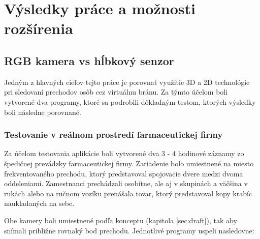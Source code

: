 \chapter{Výsledky práce a možnosti rozšírenia}
\section{RGB kamera vs hĺbkový senzor}
Jedným z hlavných cieľov tejto práce je porovnať využitie 3D a 2D technológie pri sledovaní prechodov osôb cez virtuálnu bránu. Za týmto účelom boli vytvorené dva programy, ktoré sa podrobili dôkladným testom, ktorých výsledky boli následne porovnané. 

\subsection{Testovanie v reálnom prostredí farmaceutickej firmy}
Za účelom testovania aplikácie boli vytvorené dva 3 - 4 hodinové záznamy zo špedičnej prevádzky farmaceutickej firmy. Zariadenie bolo umiestnené na miesto frekventovaného prechodu, ktorý predstavoval spojovacie dvere medzi dvoma oddeleniami. Zamestnanci prechádzali osobitne, ale aj v skupinách a väčšina v rukách alebo na ručnom vozíku prenášala tovar, ktorý predstavoval kopy krabíc naukladaných na sebe. 

Obe kamery boli umiestnené podľa konceptu (kapitola \ref{sec:draft}), tak aby snímali približne rovnaký bod prechodu. Jednotlivé programy uspeli nasledovne:  

